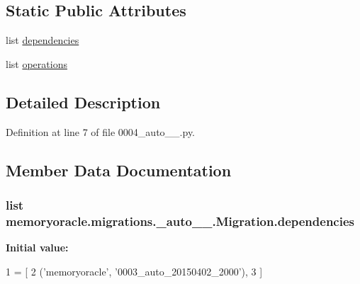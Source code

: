 \subsection*{Static Public Attributes}
\begin{DoxyCompactItemize}
\item 
list \hyperlink{classmemoryoracle_1_1migrations_1_10004__auto__20150402__2000_1_1Migration_ae0fdba95f5702c4ec8b605b5f90f192d}{dependencies}
\item 
list \hyperlink{classmemoryoracle_1_1migrations_1_10004__auto__20150402__2000_1_1Migration_a8e41e0b6119fa7ec86a386841472a802}{operations}
\end{DoxyCompactItemize}


\subsection{Detailed Description}


Definition at line 7 of file 0004\+\_\+auto\+\_\+\_.\+py.



\subsection{Member Data Documentation}
\hypertarget{classmemoryoracle_1_1migrations_1_10004__auto__20150402__2000_1_1Migration_ae0fdba95f5702c4ec8b605b5f90f192d}{}
\subsubsection[{dependencies}]{\setlength{\rightskip}{0pt plus 5cm}list memoryoracle.\+migrations.\+\_\+auto\+\_\+\_.\+Migration.\+dependencies\hspace{0.3cm}{\ttfamily [static]}}\label{classmemoryoracle_1_1migrations_1_10004__auto__20150402__2000_1_1Migration_ae0fdba95f5702c4ec8b605b5f90f192d}
{\bfseries Initial value\+:}
\begin{DoxyCode}
1 = [
2         (\textcolor{stringliteral}{'memoryoracle'}, \textcolor{stringliteral}{'0003\_auto\_20150402\_2000'}),
3     ]
\end{DoxyCode}


